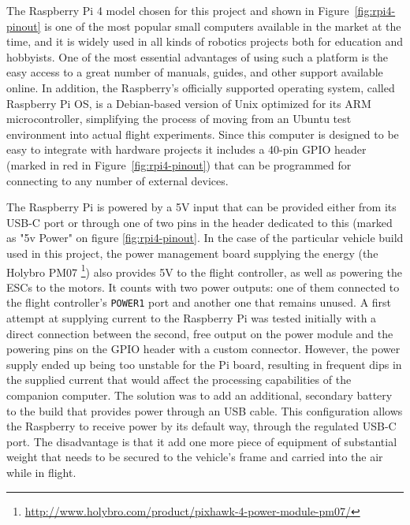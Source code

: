 The Raspberry Pi 4 model chosen for this project and shown in Figure~\ref{fig:rpi4-pinout} is one of the most popular small computers available in the market at the time, and it is widely used in all kinds of robotics projects both for education and hobbyists.
One of the most essential advantages of using such a platform is the easy access to a great number of manuals, guides, and other support available online.
In addition, the Raspberry's officially supported operating system, called Raspberry Pi OS, is a Debian-based version of Unix optimized for its ARM microcontroller, simplifying the process of moving from an Ubuntu test environment into actual flight experiments.
Since this computer is designed to be easy to integrate with hardware projects it includes a 40-pin GPIO header (marked in red in Figure~\ref{fig:rpi4-pinout}) that can be programmed for connecting to any number of external devices.


The Raspberry Pi is powered by a 5V input that can be provided either from its USB-C port or through one of two pins in the header dedicated to this (marked as "5v Power" on figure \ref{fig:rpi4-pinout}.
In the case of the particular vehicle build used in this project, the power management board supplying the energy (the Holybro PM07 \footnote{\url{http://www.holybro.com/product/pixhawk-4-power-module-pm07/}}) also provides 5V to the flight controller, as well as powering the ESCs to the motors.
It counts with two power outputs: one of them connected to the flight controller's \texttt{POWER1} port and another one that remains unused.
A first attempt at supplying current to the Raspberry Pi was tested initially with a direct connection between the second, free output on the power module and the powering pins on the GPIO header with a custom connector.
However, the power supply ended up being too unstable for the Pi board, resulting in frequent dips in the supplied current that would affect the processing capabilities of the companion computer.
The solution was to add an additional, secondary battery to the build that provides power through an USB cable.
This configuration allows the Raspberry to receive power by its default way, through the regulated USB-C port.
The disadvantage is that it add one more piece of equipment of substantial weight that needs to be secured to the vehicle's frame and carried into the air while in flight.


